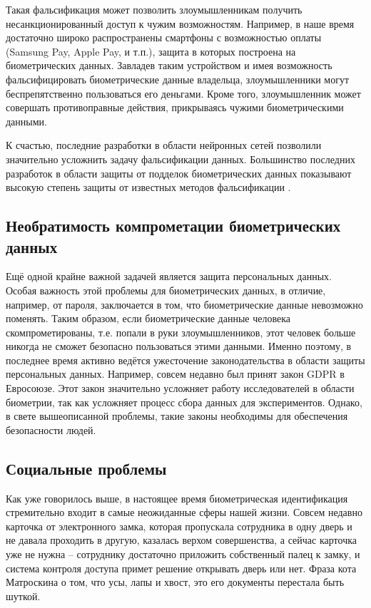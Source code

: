 \documentclass[14pt, a4paper]{extarticle}
\begin{document}
Такая фальсификация может позволить злоумышленникам получить несанкционированный доступ к чужим возможностям. Например, в наше время достаточно широко распространены смартфоны с возможностью оплаты (Samsung Pay, Apple Pay, и т.п.), защита в которых построена на биометрических данных. Завладев таким устройством и имея возможность фальсифицировать биометрические данные владельца, злоумышленники могут беспрепятственно пользоваться его деньгами. Кроме того, злоумышленник может совершать противоправные действия, прикрываясь чужими биометрическими данными.

К счастью, последние разработки в области нейронных сетей позволили значительно усложнить задачу фальсификации данных. Большинство последних разработок в области защиты от подделок биометрических данных показывают высокую степень защиты от известных методов фальсификации \cite{odinokikh2018iris, sajjad2018cnn}.

\subsection{Необратимость компрометации биометрических данных}
Ещё одной крайне важной задачей является защита персональных данных. Особая важность этой проблемы для биометрических данных, в отличие, например, от пароля, заключается в том, что биометрические данные невозможно поменять. Таким образом, если биометрические данные человека скомпрометированы, т.е. попали в руки злоумышленников, этот человек больше никогда не сможет безопасно пользоваться этими данными. Именно поэтому, в последнее время активно ведётся ужесточение законодательства в области защиты персональных данных. Например, совсем недавно был принят закон GDPR в Евросоюзе. Этот закон значительно усложняет работу исследователей в области биометрии, так как усложняет процесс сбора данных для экспериментов. Однако, в свете вышеописанной проблемы, такие законы необходимы для обеспечения безопасности людей.

\subsection{Социальные проблемы}
Как уже говорилось выше, в настоящее время биометрическая идентификация стремительно входит в самые неожиданные сферы нашей жизни. Совсем недавно карточка от электронного замка, которая пропускала сотрудника в одну дверь и не давала проходить в другую, казалась верхом совершенства, а сейчас карточка уже не нужна – сотруднику достаточно приложить собственный палец к замку, и система контроля доступа примет решение открывать дверь или нет. Фраза кота Матроскина о том, что усы, лапы и хвост, это его документы \cite{matroskin} перестала быть шуткой.
\end{document}
